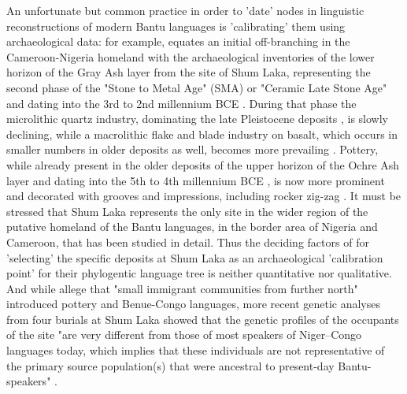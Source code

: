 \documentclass[smallextended,natbib]{svjour3}       %
\begin{document}
An unfortunate but common practice in order to 'date' nodes in linguistic reconstructions of modern Bantu languages is 'calibrating' them using archaeological data: for example, \citet[SI p.~2]{Grollemund.2015} equates an initial off-branching in the Cameroon-Nigeria homeland with the archaeological inventories of the lower horizon of the Gray Ash layer from the site of Shum Laka, representing the second phase of the "Stone to Metal Age" (SMA) or "Ceramic Late Stone Age" and dating into the 3rd to 2nd millennium BCE \citep[226--231,243]{Lavachery.2001}. During that phase the microlithic quartz industry, dominating the late Pleistocene deposits \citep[172 Fig.~4]{Cornelissen.2003,Cornelissen.2017}, is slowly declining, while a macrolithic flake and blade industry on basalt, which occurs in smaller numbers in older deposits as well, becomes more prevailing \citep[169 Fig.~1]{Cornelissen.2003,Cornelissen.2017}. Pottery, while already present in the older deposits of the upper horizon of the Ochre Ash layer and dating into the 5th to 4th millennium BCE \citep[224-225 Fig.~4.2--3]{Lavachery.2001}, is now more prominent and decorated with grooves and impressions, including rocker zig-zag \citep[231--232 Fig.~8]{Lavachery.2001}. It must be stressed that Shum Laka represents the only site in the wider region of the putative homeland of the Bantu languages, in the border area of Nigeria and Cameroon, that has been studied in detail. Thus the deciding factors of \citet{Grollemund.2015} for 'selecting' the specific deposits at Shum Laka as an archaeological 'calibration point' for their phylogentic language tree is neither quantitative nor qualitative. And while \citet[SI p.~2]{Grollemund.2015} allege that "small immigrant communities from further north" introduced pottery and Benue-Congo languages, more recent genetic analyses from four burials at Shum Laka showed that the genetic profiles of the occupants of the site "are very different from those of most speakers of Niger–Congo languages today, which implies that these individuals are not representative of the primary source population(s) that were ancestral to present-day Bantu-speakers" \citep[5]{Lipson.2020}. 
\end{document}
